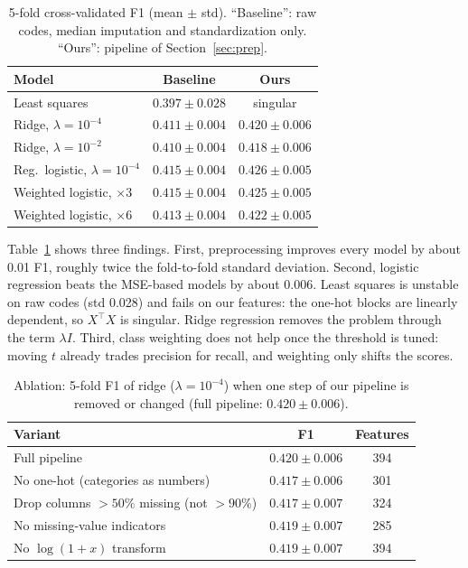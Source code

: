\documentclass[10pt,conference,compsocconf]{IEEEtran}
\begin{document}
\begin{table}[htbp]
  \centering
  \caption{5-fold cross-validated F1 (mean $\pm$ std). ``Baseline'':
  raw codes, median imputation and standardization only. ``Ours'':
  pipeline of Section~\ref{sec:prep}.}
  \label{tab:results}
  \begin{tabular}{lcc}
    \toprule
    Model & Baseline & Ours \\
    \midrule
    Least squares & $0.397 \pm 0.028$ & singular \\
    Ridge, $\lambda=10^{-4}$ & $0.411 \pm 0.004$ & $0.420 \pm 0.006$ \\
    Ridge, $\lambda=10^{-2}$ & $0.410 \pm 0.004$ & $0.418 \pm 0.006$ \\
    Reg.\ logistic, $\lambda=10^{-4}$ & $0.415 \pm 0.004$ & $\mathbf{0.426 \pm 0.005}$ \\
    Weighted logistic, $\times 3$ & $0.415 \pm 0.004$ & $0.425 \pm 0.005$ \\
    Weighted logistic, $\times 6$ & $0.413 \pm 0.004$ & $0.422 \pm 0.005$ \\
    \bottomrule
  \end{tabular}
\end{table}

Table~\ref{tab:results} shows three findings.
First, preprocessing improves every model by about 0.01 F1, roughly twice the
fold-to-fold standard deviation.
Second, logistic regression beats the MSE-based models by about 0.006. Least
squares is unstable on raw codes (std 0.028) and fails on our features: the
one-hot blocks are linearly dependent, so $X^\top X$ is singular. Ridge
regression removes the problem through the term $\lambda I$.
Third, class weighting does not help once the threshold is tuned: moving $t$
already trades precision for recall, and weighting only shifts the scores.

\begin{table}[htbp]
  \centering
  \caption{Ablation: 5-fold F1 of ridge ($\lambda=10^{-4}$) when one step of
  our pipeline is removed or changed (full pipeline: $0.420\pm0.006$).}
  \label{tab:ablation}
  \begin{tabular}{lcc}
    \toprule
    Variant & F1 & Features \\
    \midrule
    Full pipeline & $0.420 \pm 0.006$ & 394 \\
    No one-hot (categories as numbers) & $0.417 \pm 0.006$ & 301 \\
    Drop columns $>50\%$ missing (not $>90\%$) & $0.417 \pm 0.007$ & 324 \\
    No missing-value indicators & $0.419 \pm 0.007$ & 285 \\
    No $\log(1+x)$ transform & $0.419 \pm 0.007$ & 394 \\
    \bottomrule
  \end{tabular}
\end{table}
\end{document}
